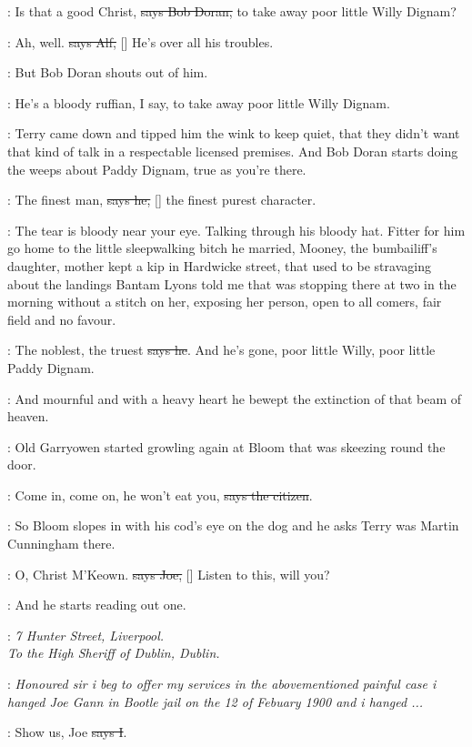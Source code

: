 \doran:
Is that a good Christ, \sout{says Bob Doran,}
to take away poor little Willy
Dignam?

\bergan:
Ah, well. \sout{says Alf,}
[]
He's over all his troubles.

\Nq:
But Bob Doran shouts out of him.

\doran:
He's a bloody ruffian, I say,
to take away poor little Willy Dignam.

\Nq:
Terry came down and tipped him the wink to keep quiet, that they
didn't want that kind of talk in a respectable licensed premises. And Bob
Doran starts doing the weeps about Paddy Dignam, true as you're there.

\doran:
The finest man, \sout{says he,}
[] the finest purest character.

\Nq:
The tear is bloody near your eye. Talking through his bloody hat.
Fitter for him go home to the little sleepwalking bitch he married,
Mooney, the bumbailiff's daughter, mother kept a kip in Hardwicke street,
that used to be stravaging about the landings Bantam Lyons told me that
was stopping there at two in the morning without a stitch on her, exposing
her person, open to all comers, fair field and no favour.

\doran:
The noblest, the truest \sout{says he}.
And he's gone, poor little Willy, poor
little Paddy Dignam.

:
And mournful and with a heavy heart he bewept the extinction of that
beam of heaven.

\Nq:
Old Garryowen started growling again at Bloom that was skeezing
round the door.

\citizen:
Come in, come on, he won't eat you,
\sout{says the citizen}.

\Nq:
So Bloom slopes in with his cod's eye on the dog and he asks Terry
was Martin Cunningham there.

\joe:
O, Christ M'Keown. \sout{says Joe,}
[]
Listen to this, will you?

\Nq:
And he starts reading out one.


\joe:
\emph{7 Hunter Street, Liverpool.\\
To the High Sheriff of Dublin, Dublin.}

\joe:
\emph{Honoured sir i beg to offer my services in the abovementioned painful
case i hanged Joe Gann in Bootle jail on the 12 of Febuary 1900 and i
hanged ...}

:
Show us, Joe \sout{says I}.

